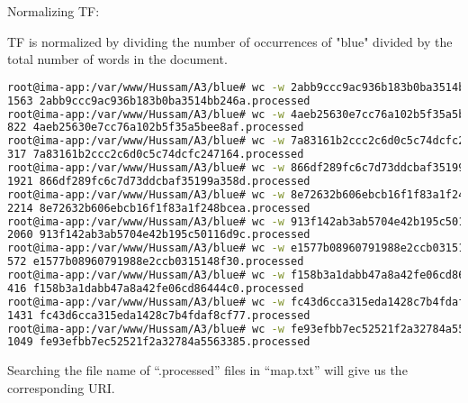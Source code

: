 \documentclass[a4paper, 11pt]{article}
\begin{document}
Normalizing TF:

TF is normalized by dividing the number of occurrences of "blue" divided by the total number of words in the document.

\begin{lstlisting}[language=bash, breakatwhitespace=〈false), label=Finding the total number of words in the documents, caption= Finding the total number of words in the documents:]
root@ima-app:/var/www/Hussam/A3/blue# wc -w 2abb9ccc9ac936b183b0ba3514bb246a.processed
1563 2abb9ccc9ac936b183b0ba3514bb246a.processed
root@ima-app:/var/www/Hussam/A3/blue# wc -w 4aeb25630e7cc76a102b5f35a5bee8af.processed
822 4aeb25630e7cc76a102b5f35a5bee8af.processed
root@ima-app:/var/www/Hussam/A3/blue# wc -w 7a83161b2ccc2c6d0c5c74dcfc247164.processed
317 7a83161b2ccc2c6d0c5c74dcfc247164.processed
root@ima-app:/var/www/Hussam/A3/blue# wc -w 866df289fc6c7d73ddcbaf35199a358d.processed
1921 866df289fc6c7d73ddcbaf35199a358d.processed
root@ima-app:/var/www/Hussam/A3/blue# wc -w 8e72632b606ebcb16f1f83a1f248bcea.processed
2214 8e72632b606ebcb16f1f83a1f248bcea.processed
root@ima-app:/var/www/Hussam/A3/blue# wc -w 913f142ab3ab5704e42b195c50116d9c.processed
2060 913f142ab3ab5704e42b195c50116d9c.processed
root@ima-app:/var/www/Hussam/A3/blue# wc -w e1577b08960791988e2ccb0315148f30.processed
572 e1577b08960791988e2ccb0315148f30.processed
root@ima-app:/var/www/Hussam/A3/blue# wc -w f158b3a1dabb47a8a42fe06cd86444c0.processed
416 f158b3a1dabb47a8a42fe06cd86444c0.processed
root@ima-app:/var/www/Hussam/A3/blue# wc -w fc43d6cca315eda1428c7b4fdaf8cf77.processed
1431 fc43d6cca315eda1428c7b4fdaf8cf77.processed
root@ima-app:/var/www/Hussam/A3/blue# wc -w fe93efbb7ec52521f2a32784a5563385.processed
1049 fe93efbb7ec52521f2a32784a5563385.processed
\end{lstlisting}

\pagebreak

Searching the file name of ``.processed'' files in ``map.txt'' will give us the corresponding URI.
\end{document}
